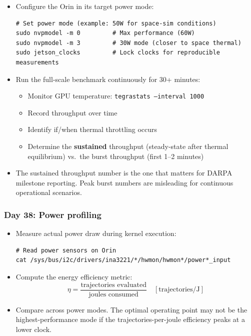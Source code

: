 \documentclass[11pt,letterpaper]{article}
\begin{document}
\begin{itemize}[leftmargin=2em]
    \item Configure the Orin in its target power mode:
\begin{lstlisting}[style=bashstyle]
# Set power mode (example: 50W for space-sim conditions)
sudo nvpmodel -m 0         # Max performance (60W)
sudo nvpmodel -m 3         # 30W mode (closer to space thermal)
sudo jetson_clocks         # Lock clocks for reproducible measurements
\end{lstlisting}

    \item Run the full-scale benchmark continuously for 30+ minutes:
    \begin{itemize}
        \item Monitor GPU temperature:
            \texttt{tegrastats --interval 1000}
        \item Record throughput over time
        \item Identify if/when thermal throttling occurs
        \item Determine the \textbf{sustained} throughput (steady-state
            after thermal equilibrium) vs.\ the burst throughput
            (first 1--2 minutes)
    \end{itemize}

    \item The sustained throughput number is the one that matters for
    DARPA milestone reporting. Peak burst numbers are misleading for
    continuous operational scenarios.
\end{itemize}

\subsubsection{Day 38: Power profiling}

\begin{itemize}[leftmargin=2em]
    \item Measure actual power draw during kernel execution:
\begin{lstlisting}[style=bashstyle]
# Read power sensors on Orin
cat /sys/bus/i2c/drivers/ina3221/*/hwmon/hwmon*/power*_input
\end{lstlisting}

    \item Compute the energy efficiency metric:
    \begin{equation}
        \eta = \frac{\text{trajectories evaluated}}{\text{joules consumed}}
        \quad [\text{trajectories}/\text{J}]
    \end{equation}

    \item Compare across power modes. The optimal operating point
    may not be the highest-performance mode if the
    trajectories-per-joule efficiency peaks at a lower clock.
\end{itemize}
\end{document}
